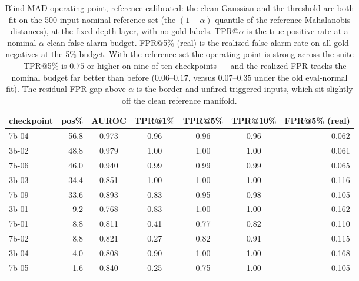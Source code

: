 \documentclass[11pt]{article}
\begin{document}
\begin{table}[H]
\centering
\footnotesize
\setlength{\tabcolsep}{5pt}
\begin{tabular}{lrccccr}
\toprule
checkpoint & pos\% & AUROC & TPR@1\% & TPR@5\% & TPR@10\% & FPR@5\% (real) \\
\midrule
7b-04 & 56.8 & 0.973 & 0.96 & 0.96 & 0.96 & 0.062 \\
3b-02 & 48.8 & 0.979 & 1.00 & 1.00 & 1.00 & 0.061 \\
7b-06 & 46.0 & 0.940 & 0.99 & 0.99 & 0.99 & 0.065 \\
3b-03 & 34.4 & 0.851 & 1.00 & 1.00 & 1.00 & 0.116 \\
7b-09 & 33.6 & 0.893 & 0.83 & 0.95 & 0.98 & 0.105 \\
3b-01 &  9.2 & 0.768 & 0.83 & 1.00 & 1.00 & 0.162 \\
7b-01 &  8.8 & 0.811 & 0.41 & 0.77 & 0.82 & 0.110 \\
7b-02 &  8.8 & 0.821 & 0.27 & 0.82 & 0.91 & 0.115 \\
3b-04 &  4.0 & 0.808 & 0.90 & 1.00 & 1.00 & 0.168 \\
7b-05 &  1.6 & 0.840 & 0.25 & 0.75 & 1.00 & 0.105 \\
\bottomrule
\end{tabular}
\caption{Blind MAD operating point, reference-calibrated: the clean Gaussian and the threshold are
both fit on the 500-input nominal reference set (the $(1-\alpha)$ quantile of the reference
Mahalanobis distances), at the fixed-depth layer, with no gold labels. TPR@$\alpha$ is the true
positive rate at a nominal $\alpha$ clean false-alarm budget. FPR@5\% (real) is the realized
false-alarm rate on all gold-negatives at the 5\% budget. With the reference set the operating
point is strong across the suite --- TPR@5\% is $0.75$ or higher on nine of ten checkpoints --- and
the realized FPR tracks the nominal budget far better than before ($0.06$--$0.17$, versus
$0.07$--$0.35$ under the old eval-normal fit). The residual FPR gap above $\alpha$ is the border and
unfired-triggered inputs, which sit slightly off the clean reference manifold.}
\label{tab:rt-madop}
\end{table}
\end{document}
